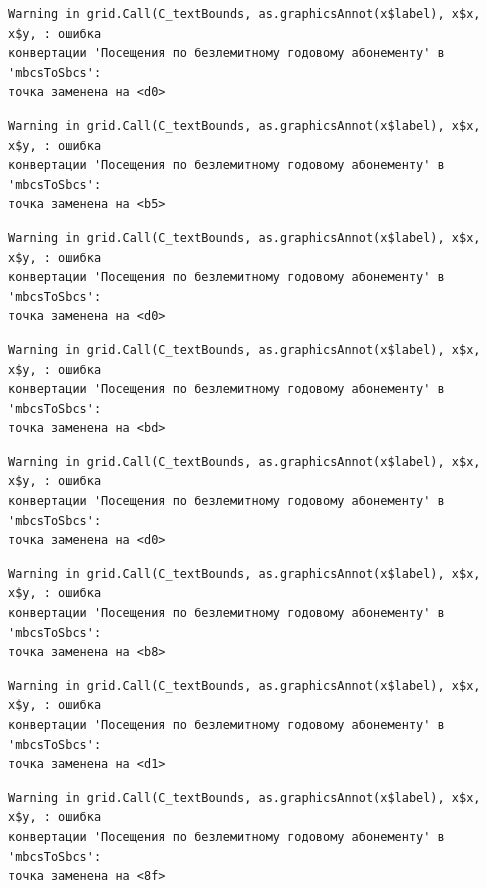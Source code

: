 \documentclass[
  letterpaper,
  DIV=11,
  numbers=noendperiod]{scrreprt}
\begin{document}
\begin{verbatim}
Warning in grid.Call(C_textBounds, as.graphicsAnnot(x$label), x$x, x$y, : ошибка
конвертации 'Посещения по безлемитному годовому абонементу' в 'mbcsToSbcs':
точка заменена на <d0>
\end{verbatim}

\begin{verbatim}
Warning in grid.Call(C_textBounds, as.graphicsAnnot(x$label), x$x, x$y, : ошибка
конвертации 'Посещения по безлемитному годовому абонементу' в 'mbcsToSbcs':
точка заменена на <b5>
\end{verbatim}

\begin{verbatim}
Warning in grid.Call(C_textBounds, as.graphicsAnnot(x$label), x$x, x$y, : ошибка
конвертации 'Посещения по безлемитному годовому абонементу' в 'mbcsToSbcs':
точка заменена на <d0>
\end{verbatim}

\begin{verbatim}
Warning in grid.Call(C_textBounds, as.graphicsAnnot(x$label), x$x, x$y, : ошибка
конвертации 'Посещения по безлемитному годовому абонементу' в 'mbcsToSbcs':
точка заменена на <bd>
\end{verbatim}

\begin{verbatim}
Warning in grid.Call(C_textBounds, as.graphicsAnnot(x$label), x$x, x$y, : ошибка
конвертации 'Посещения по безлемитному годовому абонементу' в 'mbcsToSbcs':
точка заменена на <d0>
\end{verbatim}

\begin{verbatim}
Warning in grid.Call(C_textBounds, as.graphicsAnnot(x$label), x$x, x$y, : ошибка
конвертации 'Посещения по безлемитному годовому абонементу' в 'mbcsToSbcs':
точка заменена на <b8>
\end{verbatim}

\begin{verbatim}
Warning in grid.Call(C_textBounds, as.graphicsAnnot(x$label), x$x, x$y, : ошибка
конвертации 'Посещения по безлемитному годовому абонементу' в 'mbcsToSbcs':
точка заменена на <d1>
\end{verbatim}

\begin{verbatim}
Warning in grid.Call(C_textBounds, as.graphicsAnnot(x$label), x$x, x$y, : ошибка
конвертации 'Посещения по безлемитному годовому абонементу' в 'mbcsToSbcs':
точка заменена на <8f>
\end{verbatim}
\end{document}

